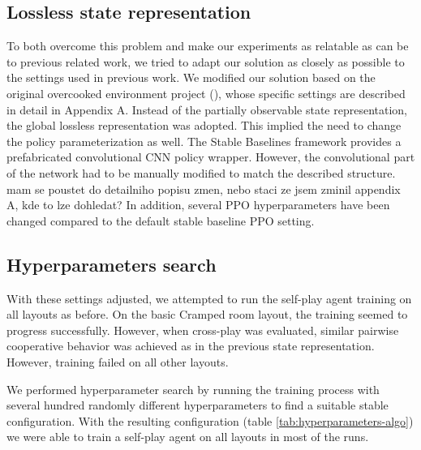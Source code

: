 \subsection*{Lossless state representation}
To both overcome this problem and make our experiments as relatable as can be to previous related work, we tried to adapt our solution as closely as possible to the settings used in previous work.
We modified our solution based on the original overcooked environment project (\cite{carroll2020utility}), whose specific settings are described in detail in Appendix A.
Instead of the partially observable state representation, the global lossless representation was adopted.
This implied the need to change the policy parameterization as well.
The Stable Baselines framework provides a prefabricated convolutional CNN policy wrapper.
However, the convolutional part of the network had to be manually modified to match the described structure. {\color{blue} mam se poustet do detailniho popisu zmen, nebo staci ze jsem zminil appendix A, kde to lze dohledat?}
In addition, several PPO hyperparameters have been changed compared to the default stable baseline PPO setting.


\subsection*{Hyperparameters search}
With these settings adjusted, we attempted to run the self-play agent training on all layouts as before.
On the basic Cramped room layout, the training seemed to progress successfully.
However, when cross-play was evaluated, similar pairwise cooperative behavior was achieved as in the previous state representation.
However, training failed on all other layouts.

We performed hyperparameter search by running the training process with several hundred randomly different hyperparameters to find a suitable stable configuration.
With the resulting configuration (table \ref{tab:hyperparameters-algo}) we were able to train a self-play agent on all layouts in most of the runs.

